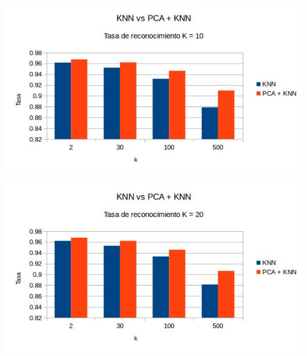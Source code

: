 \centerline{
\includegraphics[scale=0.5]{Tablas/comtrK10.jpg}
}
\centerline{
\includegraphics[scale=0.5]{Tablas/comtrK20.jpg}
}

